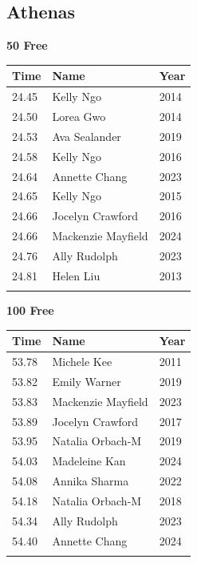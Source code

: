 
\clearpage
{}

\clearpage
\subsection{Athenas}
\vspace{1.2em}
\noindent\begin{minipage}[t]{0.48\textwidth}
\centering
\textbf{\textcolor{teamprimary}{50 Free}}\par
\vspace{0.5em}
\centering
\small
\renewcommand{\arraystretch}{1.0}
\setlength{\tabcolsep}{4pt}
\begin{tabular}{@{}p{1.8cm}p{3.0cm}p{1.0cm}@{}}
\toprule
\textbf{Time} & \textbf{Name} & \textbf{Year} \\
\midrule
24.45 & Kelly Ngo & 2014 \\
24.50 & Lorea Gwo & 2014 \\
24.53 & Ava Sealander & 2019 \\
24.58 & Kelly Ngo & 2016 \\
24.64 & Annette Chang & 2023 \\
24.65 & Kelly Ngo & 2015 \\
24.66 & Jocelyn Crawford & 2016 \\
24.66 & Mackenzie Mayfield & 2024 \\
24.76 & Ally Rudolph & 2023 \\
24.81 & Helen Liu & 2013 \\
\bottomrule
\vspace{0.5em}
\end{tabular}
\end{minipage}
\hfill
\begin{minipage}[t]{0.48\textwidth}
\centering
\textbf{\textcolor{teamprimary}{100 Free}}\par
\vspace{0.5em}
\centering
\small
\renewcommand{\arraystretch}{1.0}
\setlength{\tabcolsep}{4pt}
\begin{tabular}{@{}p{1.8cm}p{3.0cm}p{1.0cm}@{}}
\toprule
\textbf{Time} & \textbf{Name} & \textbf{Year} \\
\midrule
53.78 & Michele Kee & 2011 \\
53.82 & Emily Warner & 2019 \\
53.83 & Mackenzie Mayfield & 2023 \\
53.89 & Jocelyn Crawford & 2017 \\
53.95 & Natalia Orbach-M & 2019 \\
54.03 & Madeleine Kan & 2024 \\
54.08 & Annika Sharma & 2022 \\
54.18 & Natalia Orbach-M & 2018 \\
54.34 & Ally Rudolph & 2023 \\
54.40 & Annette Chang & 2024 \\
\bottomrule
\vspace{0.5em}
\end{tabular}
\end{minipage}
